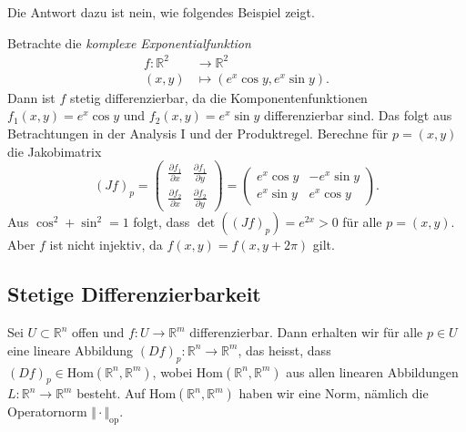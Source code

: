 \documentclass[../main.tex]{subfiles}
\begin{document}
Die Antwort dazu ist nein, wie folgendes Beispiel zeigt.

\begin{example}
  Betrachte die \emph{komplexe Exponentialfunktion}
  \begin{align*}
    f \colon \mathbb{R}^2 & \to \mathbb{R}^2 \\
    (x, y) & \mapsto (e^{x} \cos y, e^x \sin y).
  \end{align*}
  Dann ist $f$ stetig differenzierbar, da die Komponentenfunktionen
  $f_1(x, y) = e^{x} \cos y$ und $f_2(x, y) = e^x \sin y$
  differenzierbar sind. Das folgt aus Betrachtungen in
  der Analysis I und der Produktregel.
  Berechne für $p = (x, y)$ die Jakobimatrix
  \[
    {(Jf)}_p =
    \begin{pmatrix}
      \frac{\partial f_1}{\partial x} & \frac{\partial f_1}{\partial y} \\
      \frac{\partial f_2}{\partial x} & \frac{\partial f_2}{\partial y}
    \end{pmatrix}
    =
    \begin{pmatrix}
      e^x \cos y & - e^x \sin y \\
      e^x \sin y & e^x \cos y
    \end{pmatrix}.
  \]
  Aus $\cos^2 + \sin^2 = 1$ folgt, dass $\det({(Jf)}_p) = e^{2x} > 0$
  für alle $p = (x, y)$.
  Aber $f$ ist nicht injektiv, da $f(x, y) = f(x, y + 2 \pi)$ gilt.
\end{example}

\subsection*{Stetige Differenzierbarkeit}
Sei $U \subset \mathbb{R}^n$ offen und
$f \colon U \to \mathbb{R}^m$ differenzierbar.
Dann erhalten wir für alle $p \in U$ eine lineare
Abbildung ${(Df)}_p \colon \mathbb{R}^n \to \mathbb{R}^m$,
das heisst, dass ${(Df)}_p \in \text{Hom}(\mathbb{R}^n, \mathbb{R}^m)$,
wobei $\text{Hom}(\mathbb{R}^n, \mathbb{R}^m)$ aus
allen linearen Abbildungen $L \colon \mathbb{R}^n \to \mathbb{R}^m$ besteht.
Auf $\text{Hom}(\mathbb{R}^n, \mathbb{R}^m)$ haben wir
eine Norm, nämlich die Operatornorm $\Vert \cdot \Vert_{\text{op}}$.
\end{document}
